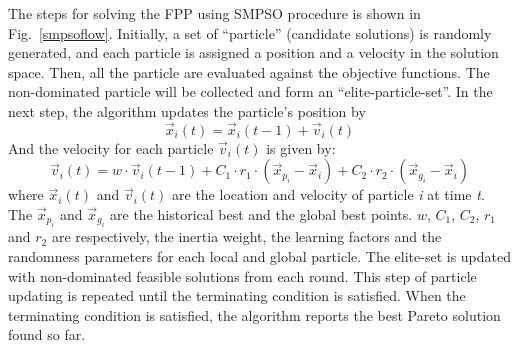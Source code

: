 \documentclass[10pt,journal,compsoc]{IEEEtran}
\newcommand{\Fig}[1]{Fig.~\ref{#1}}
\newcommand{\Eq}[1]{(\ref{#1})}
\begin{document}
The steps for solving the FPP using SMPSO procedure is shown in \Fig{smpsoflow}. Initially, a set of ``particle'' (candidate solutions) is randomly generated, and each particle is assigned a position and a velocity in the solution space. Then, all the particle are evaluated against the objective functions. The non-dominated particle will be collected and form an ``elite-particle-set''. In the next step, the algorithm updates the particle's position by
\begin{equation}\label{psoposition}
	\vec{x}_i(t) = \vec{x}_i(t-1) + \vec{v}_i(t)
\end{equation}
And the velocity for each particle $\vec{v}_i(t)$ is given by:
\begin{equation}\label{psospeed}
\vec{v}_i(t) = w \cdot \vec{v}_i(t-1) + C_1 \cdot r_1 \cdot (\vec{x}_{p_i}- \vec{x}_i)+ C_2 \cdot r_2 \cdot (\vec{x}_{g_i} - \vec{x}_i)
\end{equation}
where $\vec{x}_i(t)$ and $\vec{v}_i(t)$ are the location and velocity of particle \textit{i} at time \textit{t}. 
The $\vec{x}_{p_i}$ and $\vec{x}_{g_i}$ are the historical best and the global best points.
$w$, $C_1$, $C_2$, $r_1$ and $r_2 $ are respectively, the inertia weight, the learning factors and the randomness parameters for each local and global particle.
The elite-set is updated with non-dominated feasible solutions from each round. This step of particle updating is repeated until the terminating condition is satisfied. When the terminating condition is satisfied, the algorithm reports the best Pareto solution found so far.
%
\end{document}
